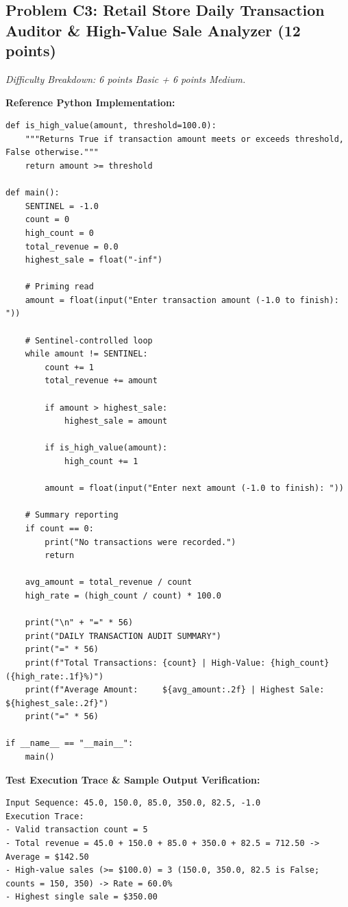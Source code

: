 \documentclass[11pt,a4paper]{article}
\begin{document}
\newpage

\subsection*{Problem C3: Retail Store Daily Transaction Auditor \& High-Value Sale Analyzer (12 points)}
\textit{Difficulty Breakdown: 6 points Basic + 6 points Medium.}

\textbf{Reference Python Implementation:}
\begin{lstlisting}
def is_high_value(amount, threshold=100.0):
    """Returns True if transaction amount meets or exceeds threshold, False otherwise."""
    return amount >= threshold

def main():
    SENTINEL = -1.0
    count = 0
    high_count = 0
    total_revenue = 0.0
    highest_sale = float("-inf")
    
    # Priming read
    amount = float(input("Enter transaction amount (-1.0 to finish): "))
    
    # Sentinel-controlled loop
    while amount != SENTINEL:
        count += 1
        total_revenue += amount
        
        if amount > highest_sale:
            highest_sale = amount
            
        if is_high_value(amount):
            high_count += 1
            
        amount = float(input("Enter next amount (-1.0 to finish): "))
        
    # Summary reporting
    if count == 0:
        print("No transactions were recorded.")
        return
        
    avg_amount = total_revenue / count
    high_rate = (high_count / count) * 100.0
    
    print("\n" + "=" * 56)
    print("DAILY TRANSACTION AUDIT SUMMARY")
    print("=" * 56)
    print(f"Total Transactions: {count} | High-Value: {high_count} ({high_rate:.1f}%)")
    print(f"Average Amount:     ${avg_amount:.2f} | Highest Sale: ${highest_sale:.2f}")
    print("=" * 56)

if __name__ == "__main__":
    main()
\end{lstlisting}

\vspace{0.4mm}
\textbf{Test Execution Trace \& Sample Output Verification:}
\begin{lstlisting}[basicstyle=\ttfamily\scriptsize]
Input Sequence: 45.0, 150.0, 85.0, 350.0, 82.5, -1.0
Execution Trace:
- Valid transaction count = 5
- Total revenue = 45.0 + 150.0 + 85.0 + 350.0 + 82.5 = 712.50 -> Average = $142.50
- High-value sales (>= $100.0) = 3 (150.0, 350.0, 82.5 is False; counts = 150, 350) -> Rate = 60.0%
- Highest single sale = $350.00
\end{lstlisting}
\end{document}
